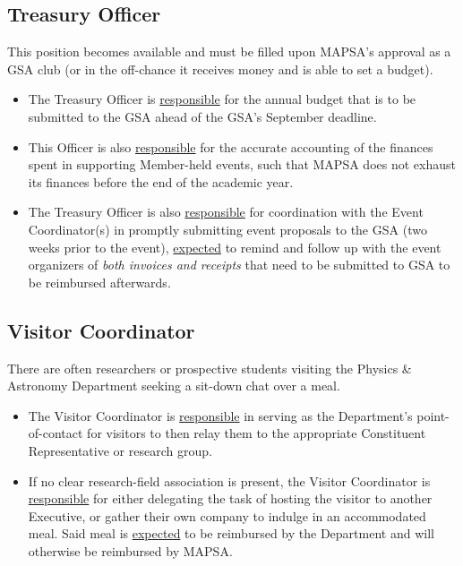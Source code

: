 \documentclass[8pt]{article}
\begin{document}
	\subsection{Treasury Officer}
	This position becomes available and must be filled upon MAPSA's approval as a GSA club (or in the off-chance it receives money and is able to set a budget). 
 	\begin{itemize}
		\item The Treasury Officer is \underline{responsible} for the annual budget that is to be submitted to the GSA ahead of the GSA's September deadline. 
		\item This Officer is also \underline{responsible} for the accurate accounting of the finances spent in supporting Member-held events, such that MAPSA does not exhaust its finances before the end of the academic year. 
		\item The Treasury Officer is also \underline{responsible} for coordination with the Event Coordinator(s) in promptly submitting event proposals to the GSA (two weeks prior to the event), \underline{expected} to remind and follow up with the event organizers of \textit{both invoices and receipts} that need to be submitted to GSA to be reimbursed afterwards.
	\end{itemize}
	\subsection{Visitor Coordinator}
	There are often researchers or prospective students visiting the Physics \& Astronomy Department seeking a sit-down chat over a meal. \begin{itemize}
		\item The Visitor Coordinator is \underline{responsible} in serving as the Department's point-of-contact for visitors to then relay them to the appropriate Constituent Representative or research group. 
		\item If no clear research-field association is present, the Visitor Coordinator is \underline{responsible} for either delegating the task of hosting the visitor to another Executive, or gather their own company to indulge in an accommodated meal. Said meal is \underline{expected} to be reimbursed by the Department and will otherwise be reimbursed by MAPSA.
	\end{itemize}
\end{document}
